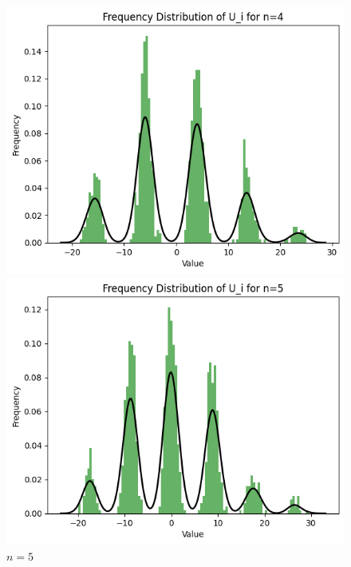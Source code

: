 \documentclass{article}
\begin{document}
\begin{figure}[H]
\begin{minipage}[b]{0.3\linewidth}
        \includegraphics[width=\linewidth]{figure/n=4.png}
        \caption{$n=4$}
    \end{minipage}
    \vspace{4mm} %
    \begin{minipage}[b]{0.3\linewidth}
        \centering
        \includegraphics[width=\linewidth]{figure/n=5.png}
        \caption{$n=5$}
    \end{minipage}
    \hfill
    \begin{minipage}[b]{0.3\linewidth}
        \centering

\end{minipage}
\end{figure}
\end{document}
